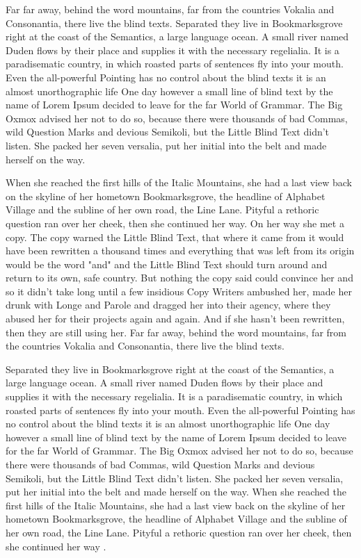 \documentclass[11pt,a4paper,twoside,openright]{book}
\begin{document}
\begin{sloppy}
Far far away, behind the word mountains, far from the countries Vokalia and Consonantia, there live the blind texts. Separated they live in Bookmarksgrove right at the coast of the Semantics, a large language ocean. A small river named Duden flows by their place and supplies it with the necessary regelialia. It is a paradisematic country, in which roasted parts of sentences fly into your mouth. Even the all-powerful Pointing has no control about the blind texts it is an almost unorthographic life One day however a small line of blind text by the name of Lorem Ipsum decided to leave for the far World of Grammar. The Big Oxmox advised her not to do so, because there were thousands of bad Commas, wild Question Marks and devious Semikoli, but the Little Blind Text didn’t listen. She packed her seven versalia, put her initial into the belt and made herself on the way.

When she reached the first hills of the Italic Mountains, she had a last view back on the skyline of her hometown Bookmarksgrove, the headline of Alphabet Village and the subline of her own road, the Line Lane. Pityful a rethoric question ran over her cheek, then she continued her way. On her way she met a copy. The copy warned the Little Blind Text, that where it came from it would have been rewritten a thousand times and everything that was left from its origin would be the word "and" and the Little Blind Text should turn around and return to its own, safe country. But nothing the copy said could convince her and so it didn’t take long until a few insidious Copy Writers ambushed her, made her drunk with Longe and Parole and dragged her into their agency, where they abused her for their projects again and again. And if she hasn’t been rewritten, then they are still using her. Far far away, behind the word mountains, far from the countries Vokalia and Consonantia, there live the blind texts.

Separated they live in Bookmarksgrove right at the coast of the Semantics, a large language ocean. A small river named Duden flows by their place and supplies it with the necessary regelialia. It is a paradisematic country, in which roasted parts of sentences fly into your mouth. Even the all-powerful Pointing has no control about the blind texts it is an almost unorthographic life One day however a small line of blind text by the name of Lorem Ipsum decided to leave for the far World of Grammar. The Big Oxmox advised her not to do so, because there were thousands of bad Commas, wild Question Marks and devious Semikoli, but the Little Blind Text didn’t listen. She packed her seven versalia, put her initial into the belt and made herself on the way. When she reached the first hills of the Italic Mountains, she had a last view back on the skyline of her hometown Bookmarksgrove, the headline of Alphabet Village and the subline of her own road, the Line Lane. Pityful a rethoric question ran over her cheek, then she continued her way \citet{small}.


\end{sloppy}
\end{document}
